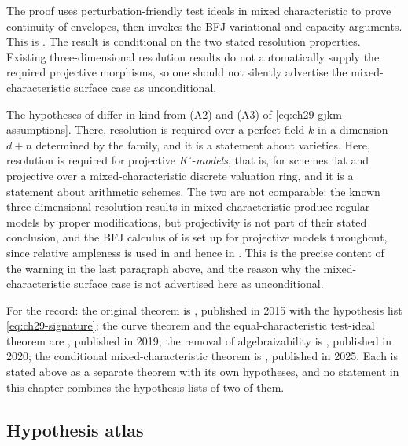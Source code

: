 The proof uses perturbation-friendly test ideals in mixed characteristic to
prove continuity of envelopes, then invokes the BFJ variational and capacity
arguments.  This is \cite[Theorems~7.1 and~8.1]{FGK25}.  The result is
conditional on the two stated resolution properties.  Existing
three-dimensional resolution results do not automatically supply the
required projective morphisms, so one should not silently advertise the
mixed-characteristic surface case as unconditional.

\begin{remark}
\label{rem:ch29-fgk-resolution}
The hypotheses of  differ in kind
from \textup{(A2)} and \textup{(A3)} of
\eqref{eq:ch29-gjkm-assumptions}.  There, resolution is required over a
perfect field $k$ in a dimension $d+n$ determined by the family, and it
is a statement about varieties.  Here, resolution is required for
projective $K^\circ$-\emph{models}, that is, for schemes flat and
projective over a mixed-characteristic discrete valuation ring, and it is a
statement about arithmetic schemes.  The two are not comparable: the known
three-dimensional resolution results in mixed characteristic produce
regular models by proper modifications, but projectivity is not part of
their stated conclusion, and
the BFJ calculus of  is set up for projective
models throughout, since relative ampleness is used in
 and hence in
.  This is the precise content of
the warning in the last paragraph above, and the reason why the
mixed-characteristic surface case is not advertised here as unconditional.
\end{remark}

\begin{remark}
\label{rem:ch29-dates}
For the record: the original theorem is \cite{BFJ15}, published in 2015
with the hypothesis list \eqref{eq:ch29-signature}; the curve theorem and
the equal-characteristic test-ideal theorem are \cite{GJKM19}, published in
2019; the removal of algebraizability is \cite{BGGJKM20}, published in
2020; the conditional mixed-characteristic theorem is \cite{FGK25},
published in 2025.  Each is stated above as a separate theorem with its own
hypotheses, and no statement in this chapter combines the hypothesis lists
of two of them.
\end{remark}

\subsection{Hypothesis atlas}
\label{sec:ch29-atlas}

